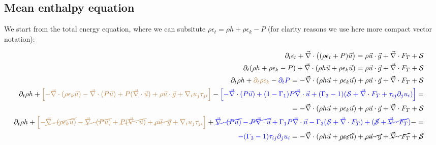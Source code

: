 \documentclass[10pt,paper=a4]{report}
\begin{document}
\fontsize{12pt}{20pt}

\subsection{Mean enthalpy equation}

We start from the total energy equation, where we can subsitute $\rho \epsilon_t = \rho h + \rho \epsilon_k - P$ (for clarity reasons we use here more compact vector notation):

\fontsize{9pt}{20pt}

\begin{align}
\partial_t \epsilon_t + \vec{\nabla} \cdot \big( (\rho \epsilon_t + P) \vec{u} \big) = \rho \vec{u} \cdot \vec{g} + \vec{\nabla} \cdot F_T + {\mathcal S}  &&  \\
\partial_t (\rho h + \rho \epsilon_k - P) + \vec{\nabla} \cdot (\rho h \vec{u} + \rho \epsilon_k \vec{u} ) = \rho \vec{u} \cdot \vec{g} + \vec{\nabla} \cdot F_T + {\mathcal S} & & \\ 
\partial_t \rho h + {\color{brown}\partial_t \rho \epsilon_k} - {\color{blue}\partial_t P} = - \vec{\nabla} \cdot (\rho h \vec{u} + \rho \epsilon_k \vec{u}) + \rho \vec{u} \cdot \vec{g} + \vec{\nabla} \cdot F_T + {\mathcal S} & & \\
\partial_t \rho h + {\color{brown}\left[-\vec{\nabla} \cdot (\rho \epsilon_k \vec{u}) - \vec{\nabla} \cdot (P \vec{u}) + P (\vec{\nabla} \cdot \vec{u}) + \rho \vec{u} \cdot \vec{g} + \nabla_i u_j \tau_{ji} \right]} - {\color{blue}\left[-\vec{\nabla} \cdot (P \vec{u}) + (1-\Gamma_1)P \vec{\nabla} \cdot \vec{u} + (\Gamma_3 - 1)({\mathcal S} + \vec{\nabla} \cdot F_T + \tau_{ij}\partial_j u_i) \right]} = && \\
= - \vec{\nabla} \cdot (\rho h \vec{u} + \rho \epsilon_k \vec{u}) + \rho \vec{u} \cdot \vec{g} + \vec{\nabla} \cdot F_T + {\mathcal S} &&   \\
\partial_t \rho h + {\color{brown}\left[-\cancel{\vec{\nabla} \cdot (\rho \epsilon_k \vec{u})} - \cancel{\vec{\nabla} \cdot (P \vec{u})} + \cancel{P (\vec{\nabla} \cdot \vec{u})} + \cancel{\rho \vec{u} \cdot \vec{g}} + \nabla_i u_j \tau_{ji} \right]} + {\color{blue}\cancel{\vec{\nabla} \cdot (P \vec{u})} - \cancel{P\vec{\nabla} \cdot \vec{u}} +\Gamma_1 P \vec{\nabla} \cdot \vec{u} - \Gamma_3 ({\mathcal S} + \vec{\nabla} \cdot F_T) + (\cancel{{\mathcal S}} + \cancel{\vec{\nabla} \cdot F_T})} - = && \\
{\color{blue} - (\Gamma_3 -1) \tau_{ij}\partial_j u_i} = - \vec{\nabla} \cdot (\rho h \vec{u} + \cancel{\rho \epsilon_k \vec{u}}) + \cancel{\rho \vec{u} \cdot \vec{g}} + \cancel{\vec{\nabla} \cdot F_T} + \cancel{{\mathcal S}} &&   
\end{align}
\end{document}
